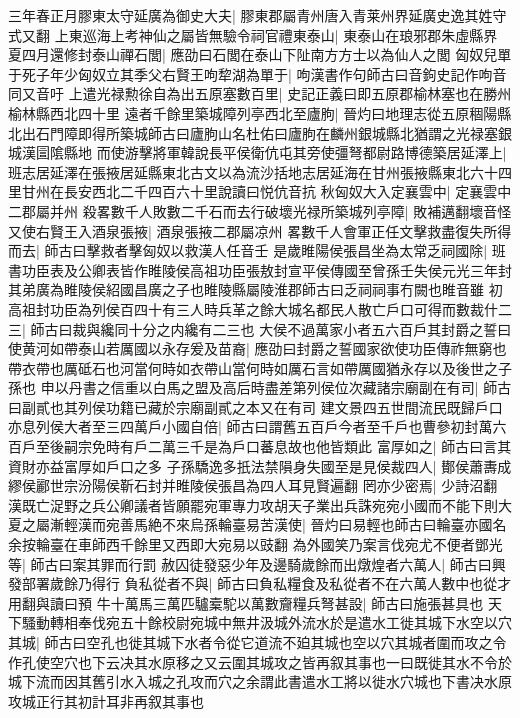 三年春正月膠東太守延廣為御史大夫|{
	膠東郡屬青州唐入青莱州界延廣史逸其姓守式又翻}
上東巡海上考神仙之屬皆無驗令祠官禮東泰山|{
	東泰山在琅邪郡朱虛縣界}
夏四月還修封泰山禪石閭|{
	應劭曰石閭在泰山下阯南方方士以為仙人之閭}
匈奴兒單于死子年少匈奴立其季父右賢王呴犂湖為單于|{
	呴漢書作句師古曰音鉤史記作呴音同又音吁}
上遣光禄勲徐自為出五原塞數百里|{
	史記正義曰即五原郡榆林塞也在勝州榆林縣西北四十里}
遠者千餘里築城障列亭西北至廬朐|{
	晉灼曰地理志從五原稒陽縣北出石門障即得所築城師古曰廬朐山名杜佑曰廬朐在麟州銀城縣北猶謂之光禄塞銀城漢圁隂縣地}
而使游擊將軍韓說長平侯衛伉屯其旁使彊弩都尉路博德築居延澤上|{
	班志居延澤在張掖居延縣東北古文以為流沙括地志居延海在甘州張掖縣東北六十四里甘州在長安西北二千四百六十里說讀曰悦伉音抗}
秋匈奴大入定襄雲中|{
	定襄雲中二郡屬并州}
殺畧數千人敗數二千石而去行破壞光禄所築城列亭障|{
	敗補邁翻壞音怪}
又使右賢王入酒泉張掖|{
	酒泉張掖二郡屬凉州}
畧數千人會軍正任文擊救盡復失所得而去|{
	師古曰擊救者擊匈奴以救漢人任音壬}
是歲睢陽侯張昌坐為太常乏祠國除|{
	班書功臣表及公卿表皆作睢陵侯高祖功臣張敖封宣平侯傳國至曾孫壬失侯元光三年封其弟廣為睢陵侯紹國昌廣之子也睢陵縣屬陵淮郡師古曰乏祠祠事冇闕也睢音雖}
初高祖封功臣為列侯百四十有三人時兵革之餘大城名都民人散亡戶口可得而數裁什二三|{
	師古曰裁與纔同十分之内纔有二三也}
大侯不過萬家小者五六百戶其封爵之誓曰使黄河如帶泰山若厲國以永存爰及苗裔|{
	應劭曰封爵之誓國家欲使功臣傳祚無窮也帶衣帶也厲砥石也河當何時如衣帶山當何時如厲石言如帶厲國猶永存以及後世之子孫也}
申以丹書之信重以白馬之盟及高后時盡差第列侯位次藏諸宗廟副在有司|{
	師古曰副貳也其列侯功籍已藏於宗廟副貳之本又在有司}
建文景四五世間流民既歸戶口亦息列侯大者至三四萬戶小國自倍|{
	師古曰謂舊五百戶今者至千戶也曹參初封萬六百戶至後嗣宗免時有戶二萬三千是為戶口蕃息故也他皆類此}
富厚如之|{
	師古曰言其資財亦益富厚如戶口之多}
子孫驕逸多扺法禁隕身失國至是見侯裁四人|{
	鄼侯蕭夀成繆侯酈世宗汾陽侯靳石封并睢陵侯張昌為四人耳見賢遍翻}
罔亦少密焉|{
	少詩沼翻}
漢既亡浞野之兵公卿議者皆願罷宛軍專力攻胡天子業出兵誅宛宛小國而不能下則大夏之屬漸輕漢而宛善馬絶不來烏孫輪臺易苦漢使|{
	晉灼曰易輕也師古曰輪臺亦國名余按輪臺在車師西千餘里又西即大宛易以豉翻}
為外國笑乃案言伐宛尤不便者鄧光等|{
	師古曰案其罪而行罰}
赦囚徒發惡少年及邊騎歲餘而出燉煌者六萬人|{
	師古曰興發部署歲餘乃得行}
負私從者不與|{
	師古曰負私糧食及私從者不在六萬人數中也從才用翻與讀曰預}
牛十萬馬三萬匹驢槖駝以萬數齎糧兵弩甚設|{
	師古曰施張甚具也}
天下騷動轉相奉伐宛五十餘校尉宛城中無井汲城外流水於是遣水工徙其城下水空以穴其城|{
	師古曰空孔也徙其城下水者令從它道流不廹其城也空以穴其城者圍而攻之令作孔使空穴也下云决其水原移之又云圍其城攻之皆再叙其事也一曰既徙其水不令於城下流而因其舊引水入城之孔攻而穴之余謂此書遣水工將以徙水穴城也下書决水原攻城正行其初計耳非再叙其事也}
